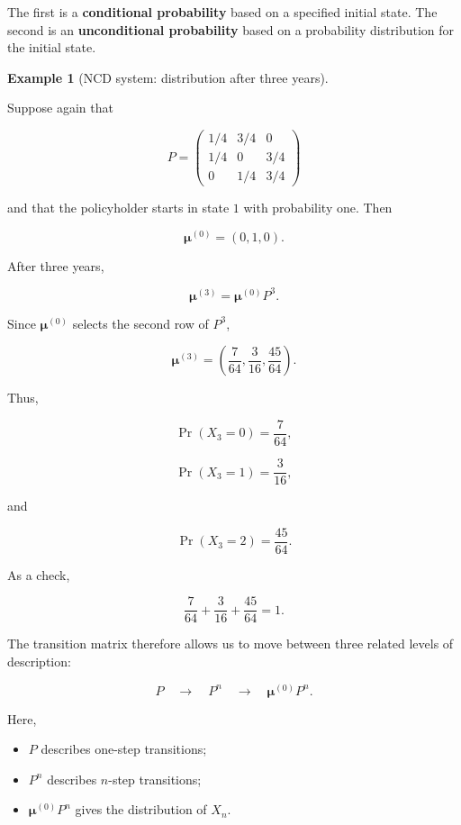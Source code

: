 \documentclass[
  letterpaper,
  DIV=11,
  numbers=noendperiod]{scrartcl}
\providecommand{\tightlist}{%
  \setlength{\itemsep}{0pt}\setlength{\parskip}{0pt}}
\theoremstyle{definition}
\newtheorem{example}{Example}[section]
\theoremstyle{remark}
\begin{document}
The first is a \textbf{conditional probability} based on a specified
initial state. The second is an \textbf{unconditional probability} based
on a probability distribution for the initial state.

\begin{example}[NCD system: distribution after three
years]\protect\hypertarget{exm-ncd-2}{}\label{exm-ncd-2}

Suppose again that

\[
P=
\begin{pmatrix}
1/4 & 3/4 & 0\\
1/4 & 0 & 3/4\\
0 & 1/4 & 3/4
\end{pmatrix}
\]

and that the policyholder starts in state \(1\) with probability one.
Then

\[
\boldsymbol{\mu}^{(0)}
=
(0,1,0).
\]

After three years,

\[
\boldsymbol{\mu}^{(3)}
=
\boldsymbol{\mu}^{(0)}P^3.
\]

Since \(\boldsymbol{\mu}^{(0)}\) selects the second row of \(P^3\),

\[
\boldsymbol{\mu}^{(3)}
=
\left(
\frac{7}{64},
\frac{3}{16},
\frac{45}{64}
\right).
\]

Thus,

\[
\Pr(X_3=0)=\frac{7}{64},
\]

\[
\Pr(X_3=1)=\frac{3}{16},
\]

and

\[
\Pr(X_3=2)=\frac{45}{64}.
\]

As a check,

\[
\frac{7}{64}+\frac{3}{16}+\frac{45}{64}=1.
\]

\end{example}

The transition matrix therefore allows us to move between three related
levels of description:

\[
\boxed{
P
\quad\longrightarrow\quad
P^n
\quad\longrightarrow\quad
\boldsymbol{\mu}^{(0)}P^n.
}
\]

Here,

\begin{itemize}
\tightlist
\item
  \(P\) describes one-step transitions;
\item
  \(P^n\) describes \(n\)-step transitions;
\item
  \(\boldsymbol{\mu}^{(0)}P^n\) gives the distribution of \(X_n\).
\end{itemize}
\end{document}
